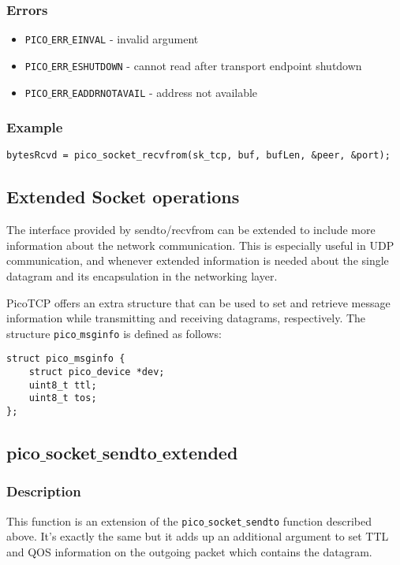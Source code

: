 \subsubsection*{Errors}
\begin{itemize}[noitemsep]
\item \texttt{PICO$\_$ERR$\_$EINVAL} - invalid argument
\item \texttt{PICO$\_$ERR$\_$ESHUTDOWN} - cannot read after transport endpoint shutdown
\item \texttt{PICO$\_$ERR$\_$EADDRNOTAVAIL} - address not available
\end{itemize}

\subsubsection*{Example}
\begin{verbatim}
bytesRcvd = pico_socket_recvfrom(sk_tcp, buf, bufLen, &peer, &port);
\end{verbatim}

\subsection{Extended Socket operations}
The interface provided by sendto/recvfrom can be extended to include more information about the network communication. 
This is especially useful in UDP communication, and whenever extended information is needed about the single datagram and its encapsulation in the networking layer.

PicoTCP offers an extra structure that can be used to set and retrieve message information while transmitting and receiving datagrams, respectively. The structure \texttt{pico$\_$msginfo} is defined as follows:
\begin{verbatim}
struct pico_msginfo {
    struct pico_device *dev;
    uint8_t ttl;
    uint8_t tos;
};
\end{verbatim}



\subsection{pico$\_$socket$\_$sendto$\_$extended}

\subsubsection*{Description}
This function is an extension of the \texttt{pico$\_$socket$\_$sendto} function described above. It's exactly the same but it adds up an additional argument to set TTL and QOS information on the outgoing packet which contains the datagram.

